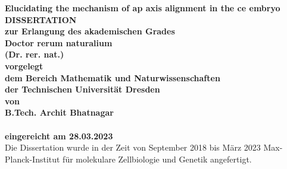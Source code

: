 \documentclass[
    BCOR=6mm,
    DIV=13,
    draft=false,
    titlepage=true,
    twoside=false,
    toc=bib,
    parskip=half-,
    chapterprefix=true,
    appendixprefix=true,
    footnotes=multiple,
    headsepline=true]{scrreprt}
\begin{document}

\begin{titlepage}
\vspace{1cm} 
\begin{center} 
    \Huge \textbf{Elucidating the mechanism of \acs{ap} axis alignment in the \acs{ce} embryo} \vspace{1cm}\\
    \Large \textbf{DISSERTATION \vspace{0.5cm}\\zur Erlangung des akademischen Grades \vspace{0.5cm}\\Doctor rerum naturalium \\(Dr. rer. nat.) \vspace{0.5cm}\\
    vorgelegt \vspace{0.5cm}\\dem Bereich Mathematik und Naturwissenschaften \\ der Technischen Universität Dresden\vspace{0.3cm} \\ von \vspace{0.3cm}\\
    B.Tech. Archit Bhatnagar \vspace{0.5cm}\\ \vspace{0.5cm}\\ eingereicht am 28.03.2023\vspace{5mm}} \vspace{\fill}\\
    Die Dissertation wurde in der Zeit von September 2018 bis M{\"a}rz 2023 Max-Planck-Institut f{\"u}r molekulare Zellbiologie und Genetik angefertigt.
\end{center}
\clearpage
\thispagestyle{plain}
\hspace{\fill}{\huge To my parents and sister...}
\vspace*{\fill}
\end{titlepage}

\pagestyle{scrheadings}



\end{document}
